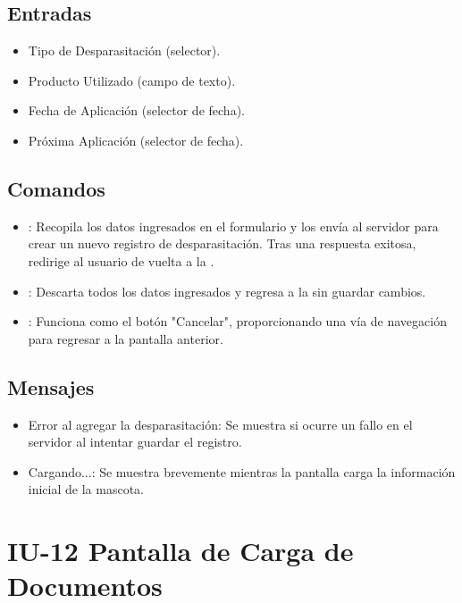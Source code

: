 \subsection{Entradas}
\begin{itemize}
    \item Tipo de Desparasitación (selector).
    \item Producto Utilizado (campo de texto).
    \item Fecha de Aplicación (selector de fecha).
    \item Próxima Aplicación (selector de fecha).
\end{itemize}

\subsection{Comandos}
\begin{itemize}
    \item {}: Recopila los datos ingresados en el formulario y los envía al servidor para crear un nuevo registro de desparasitación. Tras una respuesta exitosa, redirige al usuario de vuelta a la .
    \item {}: Descarta todos los datos ingresados y regresa a la  sin guardar cambios.
    \item {}: Funciona como el botón "Cancelar", proporcionando una vía de navegación para regresar a la pantalla anterior.
\end{itemize}

\subsection{Mensajes}
\begin{itemize}
    \item Error al agregar la desparasitación: Se muestra si ocurre un fallo en el servidor al intentar guardar el registro.
    \item Cargando...: Se muestra brevemente mientras la pantalla carga la información inicial de la mascota.
\end{itemize}

\section{IU-12 Pantalla de Carga de Documentos}

